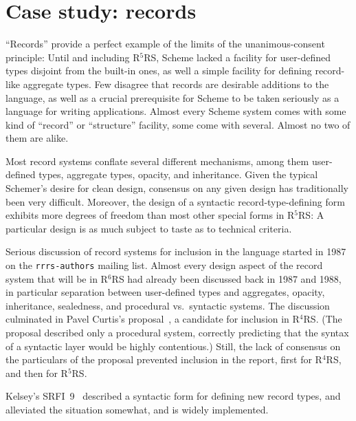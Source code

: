 \documentclass{sigplanconf}
\newcommand{\rn}[1]{R$^{#1}$RS}
\begin{document}
\section{Case study: records}
\label{sec:records}

``Records'' provide a perfect example of the limits of the
unanimous-consent principle: Until and including \rn{5}, Scheme lacked
a facility for user-defined types disjoint from the built-in ones, as
well a simple facility for defining record-like aggregate types.  Few
disagree that records are desirable additions to the language, as
well as a crucial prerequisite for Scheme to be taken seriously as a
language for writing applications.  Almost every Scheme system comes
with some kind of ``record'' or ``structure'' facility, some come with
several.  Almost no two of them are alike.

Most record systems conflate several different mechanisms, among them
user-defined types, aggregate types, opacity, and inheritance.  Given
the typical Schemer's desire for clean design, consensus on any given
design has traditionally been very difficult.  Moreover, the design of
a syntactic record-type-defining form exhibits more degrees of freedom
than most other special forms in \rn{5}: A particular design is as
much subject to taste as to technical criteria.

Serious discussion of record systems for inclusion in the language
started in 1987 on the \texttt{rrrs-authors} mailing list.  Almost
every design aspect of the record system that will be in \rn{6} had already
been discussed back in 1987 and 1988, in particular separation between
user-defined types and aggregates, opacity, inheritance, sealedness,
and procedural vs.\ syntactic systems.  The discussion culminated in
Pavel Curtis's proposal~\cite{Curtis1991}, a candidate for inclusion
in \rn{4}.  (The proposal described only a procedural system,
correctly predicting that the syntax of a syntactic layer would be
highly contentious.)  Still, the lack of consensus on the particulars
of the proposal prevented inclusion in the report, first for \rn{4},
and then for \rn{5}.

Kelsey's SRFI~9~\cite{srfi9} described a syntactic form for
defining new record types, and alleviated the situation somewhat, and
is widely implemented.
\end{document}
